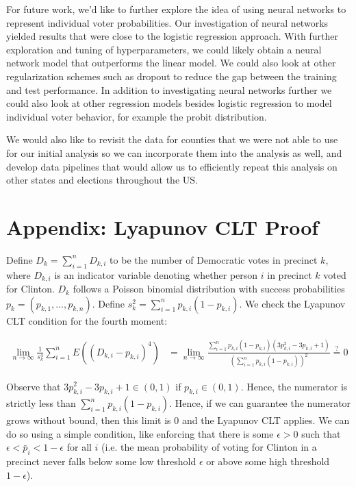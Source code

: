\documentclass[10pt, letterpaper]{article}
\begin{document}
\begin{multicols}{2}
For future work, we'd like to further explore the idea of using neural networks to represent individual voter probabilities. Our investigation of neural networks yielded results that were close to the logistic regression approach. With further exploration and tuning of hyperparameters, we could likely obtain a neural network model that outperforms the linear model. We could also look at other regularization schemes such as dropout to reduce the gap between the training and test performance. In addition to investigating neural networks further we could also look at other regression models besides logistic regression to model individual voter behavior, for example the probit distribution.

We would also like to revisit the data for counties that we were not able to use for our initial analysis so we can incorporate them into the analysis as well, and develop data pipelines that would allow us to efficiently repeat this analysis on other states and elections throughout the US. 
\end{multicols}

\section*{Appendix: Lyapunov CLT Proof}

Define $D_k = \sum_{i = 1}^n D_{k, i}$ to be the number of Democratic votes in precinct $k$, where $D_{k, i}$ is an indicator variable denoting whether person $i$ in precinct $k$ voted for Clinton. $D_k$ follows a Poisson binomial distribution with success probabilities $p_k = (p_{k, 1}, \dots, p_{k, n})$. Define $s_{k}^2 = \sum_{i = 1}^{n} p_{k, i} (1-p_{k, i})$. 
We check the Lyapunov CLT \cite{billingsley1995probability} condition for the fourth moment: 

\begin{align*}
\lim_{n \to \infty} \frac{1}{s_k^4} \sum_{i = 1}^n E \left( (D_{k, i} - p_{k, i})^4 \right) &= \lim_{n \to \infty} \frac{\sum_{i = 1}^n p_{k, i}(1-p_{k, i}) \left( 3p_{k, i}^2 - 3p_{k, i} + 1 \right)}{\left(\sum_{i = 1}^n p_{k, i} \left( 1- p_{k, i} \right) \right)^2} \stackrel{?} = 0 
\end{align*}

Observe that $3p_{k, i}^2 - 3p_{k, i} + 1 \in (0, 1)$ if $p_{k, i} \in (0, 1)$. Hence, the numerator is strictly less than $\sum_{i = 1}^n p_{k, i} (1 - p_{k, i})$. Hence, if we can guarantee the numerator grows without bound, then this limit is 0 and the Lyapunov CLT applies. We can do so using a simple condition, like enforcing that there is some $\epsilon > 0$ such that $\epsilon < \bar p_i < 1- \epsilon$ for all $i$ (i.e. the mean probability of voting for Clinton in a precinct never falls below some low threshold $\epsilon$ or above some high threshold $1-\epsilon$). 
\end{document}
